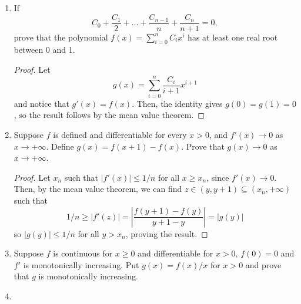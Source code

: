 \begin{enumerate}[1.]
    \begin{proof}
        If $M = 0$, this is trivial. Otherwise, choose $\epsilon < 1/M$ so that $f'(x) = 1 + \epsilon g'(x) \ge 1 + \epsilon (-M) > 0$, and thus $f$ is strictly increasing and thus one-to-one.
    \end{proof}

\item %
    If
    \[
        C_0 + \frac{C_1}{2} + \dotsc + \frac{C_{n-1}}{n} + \frac{C_n}{n + 1} = 0,
    \]
    prove that the polynomial $f(x) = \sum_{i=0}^{n} C_ix^i$ has at least one real root between 0 and 1.

    \begin{proof}
        Let 
        \[
            g(x) = \sum_{i=0}^{n} \frac{C_i}{i+1} x^{i+1}
        \]
        and notice that $g'(x) = f(x)$. Then, the identity gives $g(0) = g(1) = 0$, so the result follows by the mean value theorem.
    \end{proof}

\item %
    Suppose $f$ is defined and differentiable for every $x > 0$, and $f'(x) \to 0$ as $x \to +\infty$. Define $g(x) = f(x + 1) - f(x)$. Prove that $g(x) \to 0$ as $x \to +\infty$.

    \begin{proof}
        Let $x_n$ such that $|f'(x)| \le 1/n$ for all $x \ge x_n$, since $f'(x) \to 0$. Then, by the mean value theorem, we can find $z \in (y, y + 1) \subseteq (x_n, +\infty)$ such that 
        \[
            1/n \ge |f'(z)| = \left|\frac{f(y + 1) - f(y)}{y + 1 - y}\right| = |g(y)|
        \]
        so $|g(y)| \le 1/n$ for all $y > x_n$, proving the result.
    \end{proof}

\item %
    Suppose $f$ is continuous for $x \ge 0$ and differentiable for $x > 0$, $f(0) = 0$ and $f'$ is monotonically increasing. Put $g(x) = f(x) / x$ for $x > 0$ and prove that $g$ is monotonically increasing.

    \TODO
\item %


\end{enumerate}
